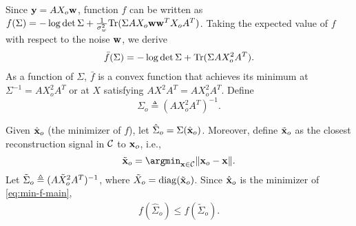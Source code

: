 \documentclass[onecolumn]{IEEEtran}
\newcommand{\wv}{{\bf w}}
\newcommand{\xvh}{\hat{\xv}}
\newcommand{\xvt}{\tilde{\xv}}
\begin{document}
Since $\yv=AX_o\wv$, function $f$ can be written as $f(\Sigma)=-\log\det \Sigma +{1\over \sigma_w^2}{\rm Tr}(\Sigma AX_o\wv\wv^TX_oA^T)$. Taking the expected value of $f$ with respect to the noise $\wv$, we derive
\begin{align}
\bar{f}(\Sigma)=-\log\det \Sigma +{\rm Tr}(\Sigma AX_o^2A^T).\label{eq:min-f-bar}
\end{align}
As a function of $\Sigma$, $\bar{f}$ is a convex function that achieves its minimum at $\Sigma^{-1}= AX_o^2A^T$ or at $X$ satisfying $AX^2A^T= AX_o^2A^T$. Define
 \[
 \Sigma_o\triangleq (AX_o^2A^T)^{-1}.
 \]
 
 
 Given $\hat{{\bf x}}_o$ (the minimizer of $f$),  let $\hat{\Sigma}_o=\Sigma(\hat{{\bf x}}_o)$.  Moreover, define $\xvt_o$ as the closest reconstruction signal in $\mathcal{C}$ to ${\bf x}_o$, i.e.,
 \[
\xvt_o=\argmin_{\xv\in\Cc}\|\xv_o-\xv\|.
 \]
 Let $ \tilde{\Sigma}_o\triangleq (A{\tilde{X}}_o^2A^T)^{-1}$, where $\Xt_o={\rm diag}({\xvt_o})$. Since $\xvh_o$ is the minimizer of \eqref{eq:min-f-main}, 
\begin{align}
f(\hat{\Sigma}_o)\leq f(\tilde{\Sigma}_o). \label{eq:thm1-step1}
\end{align}
\end{document}
